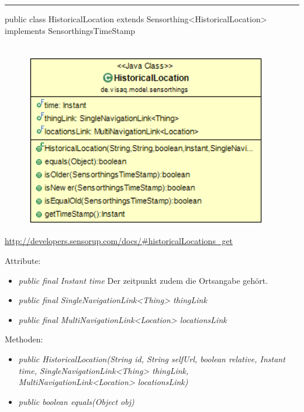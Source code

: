 \rule{\textwidth}{0.4pt}
public class HistoricalLocation extends Sensorthing<HistoricalLocation> implements SensorthingsTimeStamp
\\\\
\begin{minipage}{0.4\textwidth}
    \begin{figure}[H]
        {\centering\includegraphics[width=0.95\textwidth]{media/backend/modell/classes/HistoricalLocation.png}}
    \end{figure}
    \end{minipage} \hfill
\begin{minipage}{0.6\textwidth}
    \url{http://developers.sensorup.com/docs/#historicalLocations_get}
\end{minipage}

Attribute:
\begin{itemize}
    \item \emph{public final Instant time} Der zeitpunkt zudem die Ortsangabe gehört.
    \item \emph{public final SingleNavigationLink<Thing> thingLink} 
    \item \emph{public final MultiNavigationLink<Location> locationsLink} 
\end{itemize}
Methoden:
\begin{itemize}
    \item \emph{public HistoricalLocation(String id, String selfUrl, boolean relative, Instant time, SingleNavigationLink<Thing> thingLink, MultiNavigationLink<Location> locationsLink)}
    \item \emph{public boolean equals(Object obj)} 
\end{itemize}

